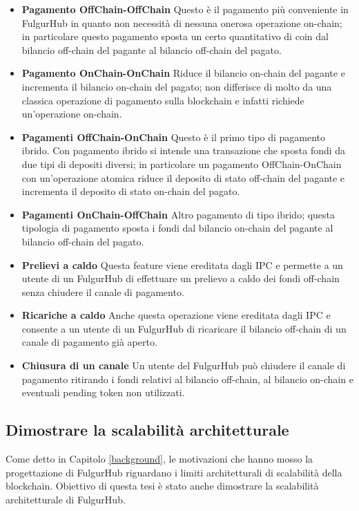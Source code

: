 \documentclass[12pt,italian,]{book}
\providecommand{\tightlist}{%
  \setlength{\itemsep}{0pt}\setlength{\parskip}{0pt}}
\begin{document}
\begin{itemize}
\tightlist
\item
  \textbf{\textbf{Pagamento OffChain-OffChain}} Questo è il pagamento più conveniente in FulgurHub in quanto non necessità di nessuna onerosa operazione on-chain; in particolare questo pagamento sposta un certo quantitativo di coin dal bilancio off-chain del pagante al bilancio off-chain del pagato.
\item
  \textbf{\textbf{Pagamento OnChain-OnChain}} Riduce il bilancio on-chain del pagante e incrementa il bilancio on-chain del pagato; non differisce di molto da una classica operazione di pagamento sulla blockchain e infatti richiede un'operazione on-chain.
\item
  \textbf{\textbf{Pagamenti OffChain-OnChain}} Questo è il primo tipo di pagamento ibrido. Con pagamento ibrido si intende una transazione che sposta fondi da due tipi di depositi diversi; in particolare un pagamento OffChain-OnChain con un'operazione atomica riduce il deposito di stato off-chain del pagante e incrementa il deposito di stato on-chain del pagato.
\item
  \textbf{\textbf{Pagamenti OnChain-OffChain}} Altro pagamento di tipo ibrido; questa tipologia di pagamento sposta i fondi dal bilancio on-chain del pagante al bilancio off-chain del pagato.
\item
  \textbf{\textbf{Prelievi a caldo}} Questa feature viene ereditata dagli IPC e permette a un utente di un FulgurHub di effettuare un prelievo a caldo dei fondi off-chain senza chiudere il canale di pagamento.
\item
  \textbf{\textbf{Ricariche a caldo}} Anche questa operazione viene ereditata dagli IPC e consente a un utente di un FulgurHub di ricaricare il bilancio off-chain di un canale di pagamento già aperto.
\item
  \textbf{\textbf{Chiusura di un canale}} Un utente del FulgurHub può chiudere il canale di pagamento ritirando i fondi relativi al bilancio off-chain, al bilancio on-chain e eventuali pending token non utilizzati.
\end{itemize}

\hypertarget{dimostrare-la-scalabilituxe0-architetturale}{%
\subsection{Dimostrare la scalabilità architetturale}\label{dimostrare-la-scalabilituxe0-architetturale}}

Come detto in Capitolo \ref{background}, le motivazioni che hanno mosso la progettazione di FulgurHub riguardano i limiti architetturali di scalabilità della blockchain. Obiettivo di questa tesi è stato anche dimostrare la scalabilità architetturale di FulgurHub.
\end{document}
